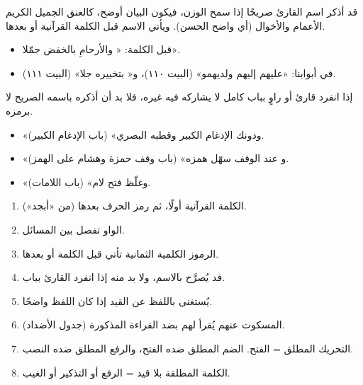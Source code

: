 \begin{mufradat}
\end{mufradat}
\maana قد أذكر اسم القارئ صريحًا إذا سمح الوزن، فيكون البيان أوضح، كالعنق الجميل الكريم الأعمام والأخوال (أي واضح الحسن). ويأتي الاسم قبل الكلمة القرآنية أو بعدها.
\begin{amthila}
\begin{itemize}
\item قبل الكلمة: «\Hamza{} والأرحامِ بالخفض جمّلا».
\item في أبوابنا: «عليهم إليهم \Hamza{} ولديهمو» (البيت ١١٠)، و«\Qalun{} بتخييره جلا» (البيت ١١١).
\end{itemize}
\end{amthila}

\maana إذا انفرد قارئ أو راوٍ بباب كامل لا يشاركه فيه غيره، فلا بد أن أذكره باسمه الصريح لا برمزه.
\begin{amthila}
\begin{itemize}
\item «ودونك الإدغام الكبير وقطبه \AbuAmr{} البصري» (باب الإدغام الكبير).
\item «و\Hamza{} عند الوقف سهّل همزه» (باب وقف حمزة وهشام على الهمز).
\item «وغلّظ \Warsh{} فتح لام» (باب اللامات).
\end{itemize}
\end{amthila}

\begin{khulasa}
\begin{enumerate}
\item الكلمة القرآنية أولًا، ثم رمز الحرف بعدها (من «أبجد»).
\item الواو تفصل بين المسائل.
\item الرموز الكلمية الثمانية تأتي قبل الكلمة أو بعدها.
\item قد يُصرَّح بالاسم، ولا بد منه إذا انفرد القارئ بباب.
\item يُستغنى باللفظ عن القيد إذا كان اللفظ واضحًا.
\item المسكوت عنهم يُقرأ لهم بضد القراءة المذكورة (جدول الأضداد).
\item التحريك المطلق = الفتح. الضم المطلق ضده الفتح، والرفع المطلق ضده النصب.
\item الكلمة المطلقة بلا قيد = الرفع أو التذكير أو الغيب.
\end{enumerate}
\end{khulasa}

